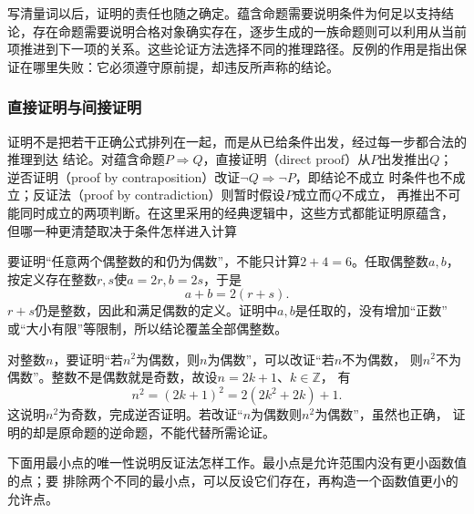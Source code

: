 写清量词以后，证明的责任也随之确定。蕴含命题需要说明条件为何足以支持结论，存在命题需要说明合格对象确实存在，逐步生成的一族命题则可以利用从当前项推进到下一项的关系。这些论证方法选择不同的推理路径。反例的作用是指出保证在哪里失败：它必须遵守原前提，却违反所声称的结论。

\subsubsection{直接证明与间接证明}
\label{sec:prelim-direct-indirect-proofs}

证明不是把若干正确公式排列在一起，而是从已给条件出发，经过每一步都合法的推理到达
结论。对蕴含命题$P\Rightarrow Q$，直接证明（direct proof）从$P$出发推出$Q$；
逆否证明（proof by contraposition）改证$\neg Q\Rightarrow\neg P$，即结论不成立
时条件也不成立；反证法（proof by contradiction）则暂时假设$P$成立而$Q$不成立，
再推出不可能同时成立的两项判断。在这里采用的经典逻辑中，这些方式都能证明原蕴含，
但哪一种更清楚取决于条件怎样进入计算

\begin{example}[从条件直接推出结论]
\label{ex:prelim-direct-even-sum}
要证明“任意两个偶整数的和仍为偶数”，不能只计算$2+4=6$。任取偶整数$a,b$，
按定义存在整数$r,s$使$a=2r,b=2s$，于是
\[
  a+b=2(r+s).
\]
$r+s$仍是整数，因此和满足偶数的定义。证明中$a,b$是任取的，没有增加“正数”
或“大小有限”等限制，所以结论覆盖全部偶整数。
\end{example}

\begin{example}[通过逆否命题证明]
\label{ex:prelim-contrapositive-even-square}
对整数$n$，要证明“若$n^2$为偶数，则$n$为偶数”，可以改证“若$n$不为偶数，
则$n^2$不为偶数”。整数不是偶数就是奇数，故设$n=2k+1$、$k\in\mathbb{Z}$，
有
\[
  n^2=(2k+1)^2=2(2k^2+2k)+1.
\]
这说明$n^2$为奇数，完成逆否证明。若改证“$n$为偶数则$n^2$为偶数”，虽然也正确，
证明的却是原命题的逆命题，不能代替所需论证。
\end{example}

下面用最小点的唯一性说明反证法怎样工作。最小点是允许范围内没有更小函数值的点；要
排除两个不同的最小点，可以反设它们存在，再构造一个函数值更小的允许点。

